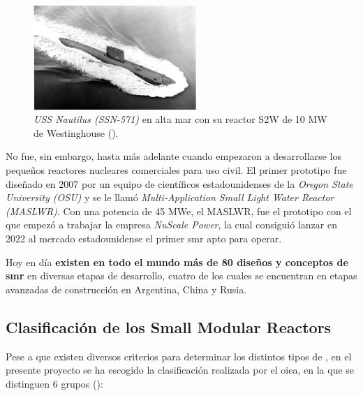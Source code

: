 \begin{figure}[h]
    \centering
    \includegraphics[width=0.55\textwidth]{content/figures/nautilus.jpg}
    \caption{\emph{USS Nautilus (SSN-571)} en alta mar con su reactor S2W de 10 MW de Westinghouse (\cite{poder_naval}).}
    \label{fig:nautilus}
\end{figure}

No fue, sin embargo, hasta más adelante cuando empezaron a desarrollarse los pequeños reactores nucleares comerciales para uso civil. El primer prototipo fue diseñado en 2007 por un equipo de científicos estadounidenses de la \emph{Oregon State University (OSU)} y se le llamó \emph{Multi-Application Small Light Water Reactor (MASLWR)}. Con una potencia de 45 MWe, el MASLWR, fue el prototipo con el que empezó a trabajar la empresa \emph{NuScale Power}, la cual consiguió lanzar en 2022 al mercado estadounidense el primer \acrshort{smr} apto para operar.

Hoy en día \textbf{existen en todo el mundo más de 80 diseños y conceptos de \acrshort{smr}} en diversas etapas de desarrollo, cuatro de los cuales se encuentran en etapas avanzadas de construcción en Argentina, China y Rusia.

\subsection{Clasificación de los Small Modular Reactors}

Pese a que existen diversos criterios para determinar los distintos tipos de , en el presente proyecto se ha escogido la clasificación realizada por el \acrshort{oiea}, en la que se distinguen 6 grupos (\cite{iaea_smr_booklet_2022}):

